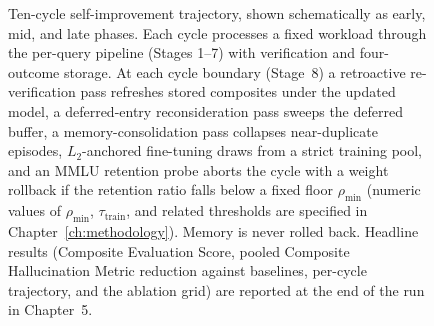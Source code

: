 \begin{figure}[htbp]
\caption[Experimental Workflow]{Ten-cycle self-improvement trajectory, shown schematically as early, mid, and late phases. Each cycle processes a fixed workload through the per-query pipeline (Stages 1--7) with verification and four-outcome storage. At each cycle boundary (Stage~8) a retroactive re-verification pass refreshes stored composites under the updated model, a deferred-entry reconsideration pass sweeps the deferred buffer, a memory-consolidation pass collapses near-duplicate episodes, $L_{2}$-anchored fine-tuning draws from a strict training pool, and an MMLU retention probe aborts the cycle with a weight rollback if the retention ratio falls below a fixed floor $\rho_{\min}$ (numeric values of $\rho_{\min}$, $\tau_{\text{train}}$, and related thresholds are specified in Chapter~\ref{ch:methodology}). Memory is never rolled back. Headline results (Composite Evaluation Score, pooled Composite Hallucination Metric reduction against baselines, per-cycle trajectory, and the ablation grid) are reported at the end of the run in Chapter~5.}
\label{fig:experimental-workflow}
\end{figure}

